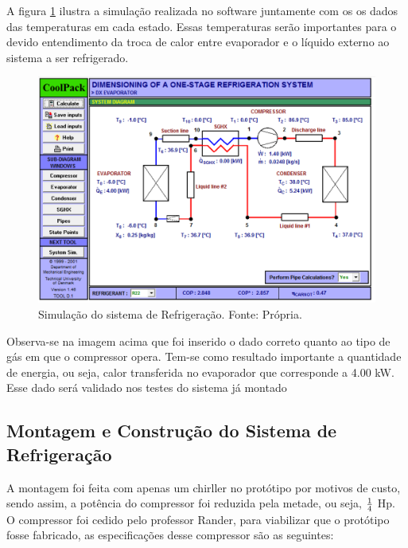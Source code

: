                 A figura \ref{simulacao-refrigeracao} ilustra a simulação realizada no software juntamente com os os
                dados das temperaturas em cada estado. Essas temperaturas serão importantes para o
                devido entendimento da troca de calor entre evaporador e o líquido externo ao
                sistema a ser refrigerado.

                \begin{figure}[!htb]
            		\centering
            		\includegraphics[scale= 0.3]{figuras/simulacao-refrigeracao.png}
            		\caption{Simulação do sistema de Refrigeração. Fonte: Própria.}
            		\label{simulacao-refrigeracao}
            	\end{figure}

                Observa-se na imagem acima que foi inserido o dado correto quanto ao tipo de
                gás em que o compressor opera. Tem-se como resultado importante a quantidade
                de energia, ou seja, calor transferida no evaporador que corresponde a 4.00 kW.
                Esse dado será validado nos testes do sistema já montado


            \subsection[Montagem e Construção do Sistema de Refrigeração]{Montagem e Construção do Sistema de Refrigeração}
                A montagem foi feita com apenas um chirller no protótipo por motivos de custo,
                sendo assim, a potência do compressor foi reduzida pela metade, ou seja, $1 \over 4$ Hp.
                O compressor foi cedido pelo professor Rander, para viabilizar que o protótipo
                fosse fabricado, as especificações desse compressor são as seguintes:

